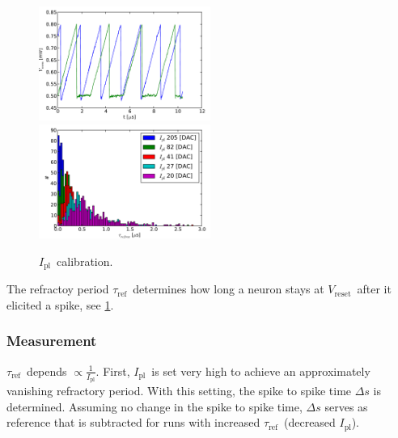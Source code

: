 \documentclass[12pt,a4paper,bibliography=totocnumbered,listof=totocnumbered, DIV12]{scrartcl}
\newcommand{\vreset}{\ensuremath{V_{\text{reset}}}}
\newcommand{\ipl}{\ensuremath{I_{\text{pl}}}}
\newcommand{\tauref}{\ensuremath{\tau_{\text{ref}}}}
\begin{document}
\begin{figure}
  \centering
  \includegraphics[width=0.5\textwidth]{figures/I_pl_trace}%
  \includegraphics[width=0.5\textwidth]{figures/I_pl_hist}
  \caption{\ipl\ calibration.}
  \label{fig:tau_ref_calibration}
\end{figure}

The refractoy period \tauref\ determines how long a neuron stays at
\vreset\ after it elicited a spike, see \cref{fig:tau_ref_calibration}.

\subsubsection*{Measurement}

\tauref\ depends $\propto \frac{1}{\ipl}$.  First, \ipl\ is set very
high to achieve an approximately vanishing refractory period. With
this setting, the spike to spike time $\Delta s$ is
determined. Assuming no change in the spike to spike time, $\Delta s$
serves as reference that is subtracted for runs with increased
\tauref\ (decreased \ipl).
\end{document}
